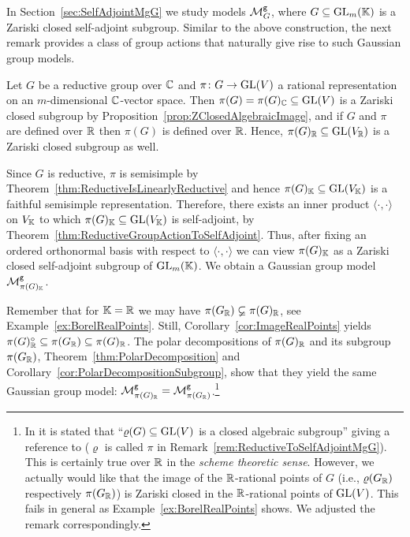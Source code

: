 In Section~\ref{sec:SelfAdjointMgG} we study models $\mathcal{M}^{\mathtt{g}}_G$, where $G \subseteq \operatorname{GL}_m(\mathbb K)$ is a Zariski closed self-adjoint subgroup. Similar to the above construction, the next remark provides a class of group actions that naturally give rise to such Gaussian group models.

\begin{remark}\label{rem:ReductiveToSelfAdjointMgG}
	Let $G$ be a reductive group over $\mathbb C$ and $\pi \colon G \to \operatorname{GL}(V)$ a rational representation on an $m$-dimensional $\mathbb C$-vector space. Then $\pi(G) = \pi(G)_\mathbb C \subseteq \operatorname{GL}(V)$ is a Zariski closed subgroup by Proposition~\ref{prop:ZClosedAlgebraicImage}, and if $G$ and $\pi$ are defined over $\mathbb R$ then $\pi(G)$ is defined over $\mathbb R$. Hence, $\pi(G)_\mathbb R \subseteq \operatorname{GL}(V_\mathbb R)$ is a Zariski closed subgroup as well.
	
	Since $G$ is reductive, $\pi$ is semisimple by Theorem~\ref{thm:ReductiveIsLinearlyReductive} and hence $\pi(G)_\mathbb K \subseteq \operatorname{GL}(V_\mathbb K)$ is a faithful semisimple representation.
	Therefore, there exists an inner product $\langle \cdot, \cdot \rangle$ on $V_\mathbb K$ to which $\pi(G)_\mathbb K \subseteq \operatorname{GL}(V_\mathbb K)$ is self-adjoint, by Theorem~\ref{thm:ReductiveGroupActionToSelfAdjoint}. Thus, after fixing an ordered orthonormal basis with respect to $\langle \cdot , \cdot \rangle$ we can view $\pi(G)_\mathbb K$ as a Zariski closed self-adjoint subgroup of $\operatorname{GL}_m(\mathbb K)$. We obtain a Gaussian group model $\mathcal{M}^{\mathtt{g}}_{\pi(G)_\mathbb K}$.
	
	Remember that for $\mathbb K = \mathbb R$ we may have $\pi(G_\mathbb R) \varsubsetneq \pi(G)_\mathbb R$, see Example~\ref{ex:BorelRealPoints}. Still, Corollary~\ref{cor:ImageRealPoints} yields $\pi(G)_\mathbb R^\circ \subseteq \pi(G_\mathbb R) \subseteq \pi(G)_\mathbb R$. The polar decompositions of $\pi(G)_\mathbb R$ and its subgroup $\pi(G_\mathbb R)$, Theorem~\ref{thm:PolarDecomposition} and Corollary~\ref{cor:PolarDecompositionSubgroup}, show that they yield the same Gaussian group model: $\mathcal{M}^{\mathtt{g}}_{\pi(G)_\mathbb R} = \mathcal{M}^{\mathtt{g}}_{\pi(G_\mathbb R)}$.\footnote{In \cite[Remark~2.4]{SiagaPaper} it is stated that ``$\varrho(G) \subseteq \operatorname{GL}(V)$ is a closed algebraic subgroup'' giving a reference to \cite[Theorem~5.39]{MilneBook} ($\varrho$ is called $\pi$ in Remark~\ref{rem:ReductiveToSelfAdjointMgG}). This is certainly true over $\mathbb R$ in the \emph{scheme theoretic sense}. However, we actually would like that the image of the $\mathbb R$-rational points of $G$ (i.e., $\varrho(G_\mathbb R)$ respectively $\pi(G_\mathbb R)$) is Zariski closed in the $\mathbb R$-rational points of $\operatorname{GL}(V)$. This fails in general as Example~\ref{ex:BorelRealPoints} shows. We adjusted the remark correspondingly.}
	

\end{remark}
